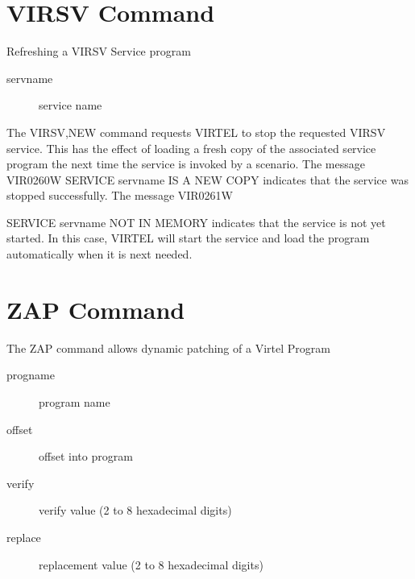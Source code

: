\documentclass[letterpaper,10pt,english]{sphinxmanual}
\begin{document}
\ignorespaces 

\section{VIRSV Command}
\label{\detokenize{audit_operations_ and_performance:virsv-command}}\label{\detokenize{audit_operations_ and_performance:index-32}}
Refreshing a VIRSV Service program

\begin{sphinxVerbatim}[commandchars=\\\{\}]
\end{sphinxVerbatim}
\begin{description}
\item[{servname}] \leavevmode
service name

\end{description}

The VIRSV,NEW command requests VIRTEL to stop the requested VIRSV service. This has the effect of loading a fresh copy of the associated service program the next time the service is invoked by a scenario. The message VIR0260W SERVICE servname IS A NEW COPY indicates that the service was stopped successfully. The message VIR0261W

SERVICE servname NOT IN MEMORY indicates that the service is not yet started. In this case, VIRTEL will start the service and load the  program automatically when it is next needed.

\ignorespaces 

\section{ZAP Command}
\label{\detokenize{audit_operations_ and_performance:zap-command}}\label{\detokenize{audit_operations_ and_performance:index-33}}
The ZAP command allows dynamic patching of a Virtel Program

\begin{sphinxVerbatim}[commandchars=\\\{\}]
\end{sphinxVerbatim}
\begin{description}
\item[{progname}] \leavevmode
program name

\item[{offset}] \leavevmode
offset into program

\item[{verify}] \leavevmode
verify value (2 to 8 hexadecimal digits)

\item[{replace}] \leavevmode
replacement value (2 to 8 hexadecimal digits)

\end{description}
\end{document}
